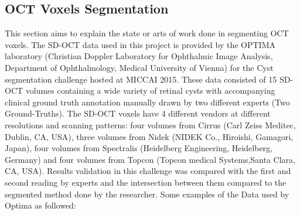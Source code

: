 \subsection{OCT Voxels Segmentation}
This section aims to explain the state or arts of work done in segmenting OCT voxels.
The SD-OCT data used in this project is provided by the OPTIMA laboratory (Christian Doppler Laboratory for Ophthalmic Image Analysis, Department of Ophthalmology, Medical University of Vienna) for the Cyst segmentation challenge hosted at MICCAI 2015.
These data consisted of 15 SD-OCT volumes containing a wide variety of retinal cysts with accompanying clinical ground truth annotation manually drawn by two different experts (Two Ground-Truths).
The SD-OCT voxels have 4 different vendors at different resolutions and scanning patterns: four volumes from Cirrus (Carl Zeiss Meditec, Dublin, CA, USA), three volumes from Nidek (NIDEK Co., Hiroishi, Gamagori, Japan), four volumes from Spectralis (Heidelberg Engineering, Heidelberg, Germany) and four volumes from Topcon (Topcon medical Systems,Santa Clara, CA, USA).
Results validation in this challenge was compared with the first and second reading by experts and the intersection between them compared to the segmented method done by the researcher.
Some examples of the Data used by Optima as followed:
